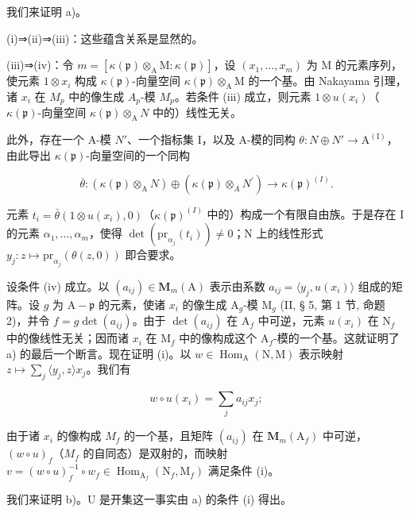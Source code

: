 我们来证明 a)。

(i)⇒(ii)⇒(iii)：这些蕴含关系是显然的。

(iii)⇒(iv)：令 \(m = [\kappa(\mathfrak{p}) \otimes_{\mathrm{A}} \mathrm{M} : \kappa(\mathfrak{p})]\)，设 \((x_{1}, \ldots, x_{m})\) 为 M 的元素序列，使元素 \(1 \otimes x_{i}\) 构成 \(\kappa(\mathfrak{p})\)-向量空间 \(\kappa(\mathfrak{p}) \otimes_{\mathrm{A}} \mathrm{M}\) 的一个基。由 Nakayama 引理，诸 \(x_{i}\) 在 \(M_{p}\) 中的像生成 \(A_{p}\)-模 \(M_{p}\)。若条件 (iii) 成立，则元素 \(1 \otimes u(x_{i})\)（\(\kappa(\mathfrak{p})\)-向量空间 \(\kappa(\mathfrak{p}) \otimes_{\mathrm{A}} N\) 中的）线性无关。

此外，存在一个 A-模 \(N'\)、一个指标集 I，以及 A-模的同构 \(\theta : N \oplus N' \to \mathrm{A}^{(\mathrm{I})}\)，由此导出 \(\kappa(\mathfrak{p})\)-向量空间的一个同构

\[
\overline {{{\theta}}}: (\kappa (\mathfrak {p}) \otimes_ {\mathrm{A}} N) \oplus (\kappa (\mathfrak {p}) \otimes_ {A} N ^ {\prime}) \rightarrow \kappa (\mathfrak {p}) ^ {(I)}.
\]

元素 \(t_i = \bar{\theta}(1 \otimes u(x_i), 0)\)（\(\kappa(\mathfrak{p})^{(I)}\) 中的）构成一个有限自由族。于是存在 I 的元素 \(\alpha_1, \ldots, \alpha_{m}\)，使得 \(\det(\mathrm{pr}_{\alpha_j}(t_i)) \neq 0\)；N 上的线性形式 \(y_j : z \mapsto \mathrm{pr}_{\alpha_j}(\theta(z, 0))\) 即合要求。

设条件 (iv) 成立。以 \((a_{ij}) \in \mathbf{M}_m(\mathrm{A})\) 表示由系数 \(a_{ij} = \langle y_j, u(x_i)\rangle\) 组成的矩阵。设 \(g\) 为 \(\mathrm{A} - \mathfrak{p}\) 的元素，使诸 \(x_i\) 的像生成 \(\mathrm{A}_g\)-模 \(\mathrm{M}_g\) (II, § 5, 第 1 节, 命题 2)，并令 \(f = g \det(a_{ij})\)。由于 \(\det(a_{ij})\) 在 \(\mathrm{A}_f\) 中可逆，元素 \(u(x_i)\) 在 \(\mathrm{N}_f\) 中的像线性无关；因而诸 \(x_i\) 在 \(\mathrm{M}_f\) 中的像构成这个 \(\mathrm{A}_f\)-模的一个基。这就证明了 a) 的最后一个断言。现在证明 (i)。以 \(w \in \operatorname{Hom}_{\mathrm{A}}(\mathrm{N}, \mathrm{M})\) 表示映射 \(z \mapsto \sum_{j} \langle y_j, z\rangle x_j\)。我们有

\[
w \circ u (x _ {i}) = \sum_ {j} a _ {i j} x _ {j};
\]

由于诸 \(x_{i}\) 的像构成 \(M_{f}\) 的一个基，且矩阵 \((a_{ij})\) 在 \(\mathbf{M}_{m}(\mathrm{A}_{f})\) 中可逆，\((w \circ u)_{f}\)（\(M_{f}\) 的自同态）是双射的，而映射 \(v = (w \circ u)_{f}^{-1} \circ w_{f} \in \operatorname{Hom}_{\mathrm{A}_{f}}(\mathrm{N}_{f}, \mathrm{M}_{f})\) 满足条件 (i)。

我们来证明 b)。U 是开集这一事实由 a) 的条件 (i) 得出。


